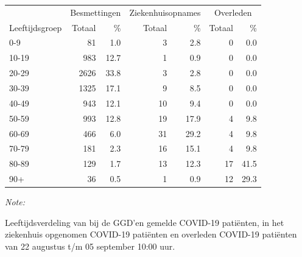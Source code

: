 \documentclass[
  english,
  man,floatsintext]{apa6}
\begin{document}
\begin{table}[H]
\centering\begingroup\fontsize{11}{13}\selectfont

\begin{threeparttable}
\begin{tabular}{lrrrrrr}
\toprule
\multicolumn{1}{c}{ } & \multicolumn{2}{c}{Besmettingen} & \multicolumn{2}{c}{Ziekenhuisopnames} & \multicolumn{2}{c}{Overleden} \\
\cmidrule(l{3pt}r{3pt}){2-3} \cmidrule(l{3pt}r{3pt}){4-5} \cmidrule(l{3pt}r{3pt}){6-7}
Leeftijdsgroep & Totaal & \% & Totaal & \% & Totaal & \%\\
\midrule
0-9 & 81 & 1.0 & 3 & 2.8 & 0 & 0.0\\
10-19 & 983 & 12.7 & 1 & 0.9 & 0 & 0.0\\
20-29 & 2626 & 33.8 & 3 & 2.8 & 0 & 0.0\\
30-39 & 1325 & 17.1 & 9 & 8.5 & 0 & 0.0\\
40-49 & 943 & 12.1 & 10 & 9.4 & 0 & 0.0\\
50-59 & 993 & 12.8 & 19 & 17.9 & 4 & 9.8\\
60-69 & 466 & 6.0 & 31 & 29.2 & 4 & 9.8\\
70-79 & 181 & 2.3 & 16 & 15.1 & 4 & 9.8\\
80-89 & 129 & 1.7 & 13 & 12.3 & 17 & 41.5\\
90+ & 36 & 0.5 & 1 & 0.9 & 12 & 29.3\\
\bottomrule
\end{tabular}
\begin{tablenotes}
\item \textit{Note: } 
\item Leeftijdsverdeling van bij de GGD’en gemelde COVID-19 patiënten, in het ziekenhuis opgenomen COVID-19 patiënten en overleden COVID-19 patiënten van 22 augustus t/m 05 september 10:00 uur.
\end{tablenotes}
\end{threeparttable}
\endgroup{}
\end{table}
\end{document}
